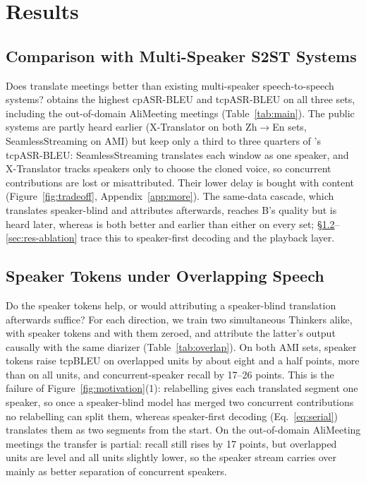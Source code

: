\section{Results}
\label{sec:results}



\subsection{Comparison with Multi-Speaker S2ST Systems}
\label{sec:res-sys}

Does \sys{} translate meetings better than existing multi-speaker speech-to-speech systems? \sys{} obtains the highest
cpASR-BLEU and tcpASR-BLEU on all three sets, including the out-of-domain AliMeeting meetings (Table~\ref{tab:main}).
The public systems are partly heard earlier (X-Translator on both Zh$\rightarrow$En sets, SeamlessStreaming on AMI)
but keep only a third to three quarters of \sys{}'s tcpASR-BLEU: SeamlessStreaming translates each window as one speaker, and X-Translator tracks speakers only to choose
the cloned voice, so concurrent contributions are lost or misattributed. Their lower
delay is bought with content (Figure~\ref{fig:tradeoff}, Appendix~\ref{app:more}). The same-data cascade, which
translates speaker-blind and attributes afterwards, reaches B's quality but is heard later, whereas \sys{} is both
better and earlier than either on every set; \S\ref{sec:res-overlap}--\ref{sec:res-ablation} trace this to
speaker-first decoding and the playback layer.



\subsection{Speaker Tokens under Overlapping Speech}
\label{sec:res-overlap}

Do the speaker tokens help, or would attributing a speaker-blind translation afterwards suffice? For each direction,
we train two simultaneous Thinkers alike, with speaker tokens and with them zeroed, and attribute the latter's output
causally with the same diarizer (Table~\ref{tab:overlap}). On both AMI sets, speaker tokens raise tcpBLEU on overlapped
units by about eight and a half points, more than on all units, and concurrent-speaker recall by 17--26 points. This is
the failure of Figure~\ref{fig:motivation}(1): relabelling gives each translated segment one speaker, so once a
speaker-blind model has merged two concurrent contributions no relabelling can split them, whereas speaker-first
decoding (Eq.~\eqref{eq:serial}) translates them as two segments from the start. On the out-of-domain AliMeeting
meetings the transfer is partial: recall still rises by 17 points, but overlapped units are level and all units
slightly lower, so the speaker stream carries over mainly as better separation of concurrent speakers.

